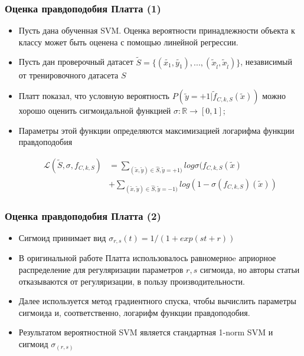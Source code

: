 \documentclass{beamer}
\begin{document}
\begin{frame}
	\frametitle{Оценка правдоподобия Платта (1)}

	\begin{itemize}
		\item Пусть дана обученная SVM. Оценка вероятности принадлежности объекта к
		      классу может быть оценена с помощью линейной регрессии.
		\item Пусть дан проверочный датасет $\tilde{S} = \{(\tilde{x_1},
			      \tilde{y_1}), ..., (\tilde{x}_{\tilde{l}}, \tilde{x}_{\tilde{l}})
			      \}$, независимый от тренировочного датасета $S$

		\item Платт показал, что условную вероятность $P(\tilde{y} = +1 |
			      \tilde{f}_{C, k, S}(\tilde{x}))$ можно хорошо оценить сигмоидальной
		      функцией $\sigma : \mathbb{R} \rightarrow [0, 1]$;

		\item Параметры этой функции определяются максимизацией логарифма
		      функции правдоподобия

		      \vspace{-25pt}
		      \begin{align*}
			      \mathcal{L}(\tilde{S}, \sigma, f_{C, k, S}) & =
			      \sum_{(\tilde{x},
				      \tilde{y}) \in \hat{S}, \tilde{y} = +1)} log \sigma (f_{C, k,
			      S}(\tilde{x})                                                     \\
			                                                  & + \sum_{(\tilde{x},
				      \tilde{y}) \in \hat{S}, \tilde{y} = -1)} log (1 - \sigma(f_{C, k,
				      S})(\tilde{x}))
		      \end{align*}
	\end{itemize}
\end{frame}

\begin{frame}
	\frametitle{Оценка правдоподобия Платта (2)}
	\begin{itemize}
		\item Сигмоид принимает вид $\sigma_{r,s}(t) = 1 / (1 + exp(st + r))$
		\item В оригинальной работе Платта использовалось равномерноe априорное
		      распределение для регуляризации параметров $r, s$ сигмоида, но авторы
		      статьи отказываются от регуляризации, в пользу производительности.
		\item Далее используется метод градиентного спуска, чтобы вычислить
		      параметры сигмоида и, соответственно, логарифм функции правдоподобия.
		\item Результатом вероятностной SVM является стандартная 1-norm SVM и
		      сигмоид $\sigma_{(r,s)}$
	\end{itemize}
\end{frame}
\end{document}
